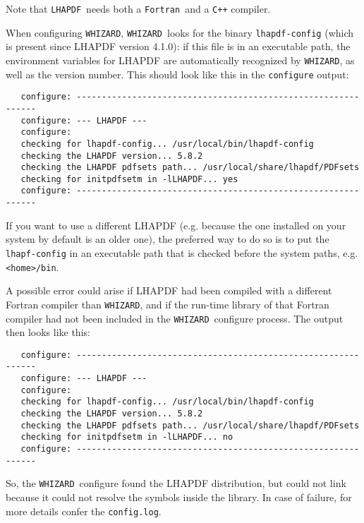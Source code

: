 \documentclass[12pt]{book}
\newcommand{\ttt}[1]{\texttt{#1}}
\newcommand{\whizard}{\texttt{WHIZARD}}
\newcommand{\lhapdf}{\texttt{LHAPDF}}
\newcommand{\fortran}{\texttt{Fortran}}
\begin{document}
Note that \lhapdf\ needs both a \fortran\ and a \ttt{C++} compiler.

When configuring \whizard, \whizard\ looks for the binary
\ttt{lhapdf-config} (which is present since LHAPDF version 4.1.0): if
this file is in an executable path, the environment variables for
LHAPDF are automatically recognized by \whizard, as well as the version
number. This should look like this in the \ttt{configure} output:   

\begin{footnotesize}
\begin{verbatim}
   configure: --------------------------------------------------------------
   configure: --- LHAPDF ---
   configure:
   checking for lhapdf-config... /usr/local/bin/lhapdf-config
   checking the LHAPDF version... 5.8.2
   checking the LHAPDF pdfsets path... /usr/local/share/lhapdf/PDFsets
   checking for initpdfsetm in -lLHAPDF... yes
   configure: --------------------------------------------------------------
\end{verbatim}
\end{footnotesize}

If you want to use a different LHAPDF (e.g. because the one installed
on your system by default is an older one), the preferred way to do so
is to put the \ttt{lhapf-config} in an executable path that is checked
before the system paths, e.g. \ttt{<home>/bin}. 

A possible error could arise if LHAPDF had been compiled with a
different Fortran compiler than \whizard, and if the run-time library
of that Fortran compiler had not been included in the \whizard\
configure process. The output then looks like this:

\begin{footnotesize}
\begin{verbatim}
   configure: --------------------------------------------------------------
   configure: --- LHAPDF ---
   configure:
   checking for lhapdf-config... /usr/local/bin/lhapdf-config
   checking the LHAPDF version... 5.8.2
   checking the LHAPDF pdfsets path... /usr/local/share/lhapdf/PDFsets
   checking for initpdfsetm in -lLHAPDF... no
   configure: --------------------------------------------------------------
\end{verbatim}
\end{footnotesize}

So, the \whizard\ configure found the LHAPDF distribution, but could
not link because it could not resolve the symbols inside the
library. In case of failure, for more details confer the
\ttt{config.log}. 
\end{document}
